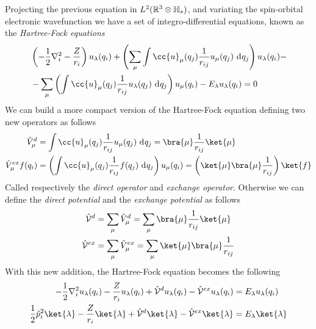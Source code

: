 \documentclass[../qm.tex]{subfiles}
\begin{document}
	Projecting the previous equation in $L^2(\mathbb{R}^3\otimes\mathbb{H}_s)$, and variating the spin-orbital electronic wavefunction we have a set of integro-differential equations, known as the \textit{Hartree-Fock equations}
	\begin{equation}
		\begin{aligned}
			&\left( -\frac{1}{2}\nabla_i^2-\frac{Z}{r_i} \right)u_{\lambda}(q_i)+\left( \sum_{\mu}\int \cc{u}_{\mu}(q_j)\frac{1}{r_{ij}}u_{\mu}(q_j)\diff{q_j} \right)u_{\lambda}(q_i)-\\
			&-\sum_{\mu}\left( \int \cc{u}_{\mu}(q_j)\frac{1}{r_{ij}}u_{\lambda}(q_j)\diff{q_j} \right)u_{\mu}(q_i)-E_{\lambda}u_{\lambda}(q_i)=0
		\end{aligned}
		\label{eq:hartreefockequation}
	\end{equation}
	We can build a more compact version of the Hartree-Fock equation defining two new operators as follows
	\begin{equation}
		\begin{aligned}
			\opr{V}^d_{\mu}&=\int\cc{u}_{\mu}(q_j)\frac{1}{r_{ij}}u_{\mu}(q_j)\diff{q_j}=\bra{\mu}\frac{1}{r_{ij}}\ket{\mu}\\
			\opr{V}^{ex}_{\mu}f(q_i)&=\left(\int\cc{u}_{\mu}(q_j)\frac{1}{r_{ij}}f(q_j)\diff{q_j}\right)u_{\mu}(q_i)=\left( \ket{\mu}\bra{\mu}\frac{1}{r_{ij}} \right)\ket{f}\\
		\end{aligned}
		\label{eq:exchangedirectoperatorhf}
	\end{equation}
	Called respectively the \textit{direct operator} and \textit{exchange operator}. Otherwise we can define the \textit{direct potential} and the \textit{exchange potential} as follows
	\begin{equation}
		\begin{aligned}
			\opr{\mathcal{V}}^d&=\sum_{\mu}\opr{V}^d_{\mu}=\sum_{\mu}\bra{\mu}\frac{1}{r_{ij}}\ket{\mu}\\
			\opr{\mathcal{V}}^{ex}&=\sum_{\mu}\opr{V}^{ex}_{\mu}=\sum_{\mu}\ket{\mu}\bra{\mu}\frac{1}{r_{ij}}
		\end{aligned}
		\label{eq:exchangedirectpotentialhf}
	\end{equation}
	With this new addition, the Hartree-Fock equation becomes the following
	\begin{equation}
		\begin{aligned}
			-\frac{1}{2}\nabla_i^2u_{\lambda}(q_i)-\frac{Z}{r_i}u_{\lambda}(q_i)+\opr{\mathcal{V}}^du_{\lambda}(q_i)-\opr{\mathcal{V}}^{ex}u_{\lambda}(q_i)&=E_{\lambda}u_{\lambda}(q_i)\\
			\frac{1}{2}\opr{p}_i^2\ket{\lambda}-\frac{Z}{r_i}\ket{\lambda}+\opr{\mathcal{V}}^d\ket{\lambda}-\opr{\mathcal{V}}^{ex}\ket{\lambda}&=E_{\lambda}\ket{\lambda}
		\end{aligned}
		\label{eq:hartreefockeqpotentials}
	\end{equation}
\end{document}
